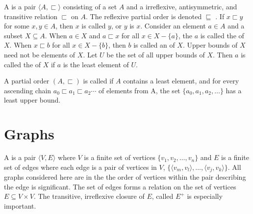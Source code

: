 \pn A  is a pair $\langle A, \sqsubset\rangle$ consisting of a set $A$ and a irreflexive, antisymmetric, and transitive relation $\sqsubset$ on $A$. The reflexive partial order is denoted $\sqsubseteq$ .  
If $x\sqsubset y$ for some $x,y\in A$, then $x$ is called  $y$, or $y$ is  $x$.  
Consider an element $a\in A$ and a subset $X\subseteq A$.  When $a\in X$ and $a \sqsubset x$ for all $x\in X\minus\{a\}$, the $a$ is called the  of $X$.  
When $x \sqsubset b$ for all $x\in X\minus\{b\}$, then $b$ is called an  of 
$X$.  Upper bounds of $X$ need not be elements of $X$.
Let $U$ be the set of all upper bounds of $X$.  Then $a$ is called the  of $X$ if 
$a$ is the least element of $U$.

\pn A partial order $(A, \sqsubset)$ is called  if $A$ contains a least element, and 
for every ascending chain
\(a_0 \sqsubset a_1 \sqsubset a_2 \cdots\)
of elements from A, the set
\(\{a_0,a_1,a_2,\ldots\}\)
has a least upper bound.

\section{Graphs}\label{sec:informal_graphs}

\pn A  is a pair $\langle V,E\rangle$ where $V$ is a finite set of vertices
\(\{v_1,v_2,\ldots,v_n\}\)
and $E$ is a finite set of edges where each edge is a pair of vertices in $V$,
\(\{\langle v_m,v_l\rangle,\ldots,\langle v_j,v_k\rangle\}\).  
All graphs considered here are  in the the order of vertices within the pair
describing the edge is significant.  
The set of edges forms a relation on the set of vertices
\(E\subseteq V\times V\).  
The transitive, irreflexive closure of $E$, called $E^{+}$ is especially important.

